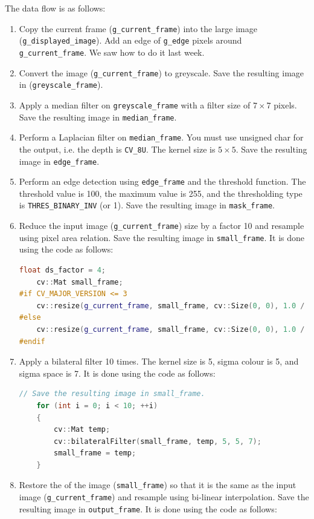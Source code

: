 \documentclass[english,a4paper,12pt,oneside]{article}
\begin{document}
The data flow is as follows:
\begin{enumerate}
\item Copy the current frame (\verb+g_current_frame+) into the large image (\verb+g_displayed_image+). Add an edge of \verb+g_edge+ pixels around \verb+g_current_frame+.
    We saw how to do it last week.
\item Convert the image (\verb+g_current_frame+) to greyscale. Save the resulting image in (\verb+greyscale_frame+).
\item Apply a median filter on \verb+greyscale_frame+ with a filter size of $7 \times 7$ pixels. Save the resulting image in \verb+median_frame+.
\item Perform a Laplacian filter on \verb+median_frame+. 
You must use unsigned char for the output, i.e. the depth is \verb+CV_8U+. 
The kernel size is $5 \times 5$.
Save the resulting image in \verb+edge_frame+.    
\item Perform an edge detection using \verb+edge_frame+ and the threshold function. The threshold value is 100, the maximum value is 255, and the thresholding type is \verb+THRES_BINARY_INV+ (or 1).
   Save the resulting image in \verb+mask_frame+.
\item Reduce the input image (\verb+g_current_frame+) size by a factor 10 and resample using pixel area relation. Save the resulting image in \verb+small_frame+. It is done using the code as follows:

\begin{lstlisting}[language=c++]
    float ds_factor = 4;
    cv::Mat small_frame;
#if CV_MAJOR_VERSION <= 3
    cv::resize(g_current_frame, small_frame, cv::Size(0, 0), 1.0 / ds_factor, 1.0 / ds_factor, CV_INTER_AREA);
#else
    cv::resize(g_current_frame, small_frame, cv::Size(0, 0), 1.0 / ds_factor, 1.0 / ds_factor, cv::INTER_AREA);
#endif
\end{lstlisting}

    \item Apply a bilateral filter 10 times. 
    The kernel size is 5, sigma colour is 5, and sigma space is 7.
It is done using the code as follows:

\begin{lstlisting}[language=c++]
    // Save the resulting image in small_frame.
    for (int i = 0; i < 10; ++i)
    {
        cv::Mat temp;
        cv::bilateralFilter(small_frame, temp, 5, 5, 7);
        small_frame = temp;
    }
    \end{lstlisting}

\item Restore the of the image (\verb+small_frame+) so that it is the same as the input image (\verb+g_current_frame+) and resample using bi-linear interpolation. Save the resulting image in \verb+output_frame+. 
It is done using the code as follows:


\end{enumerate}
\end{document}
